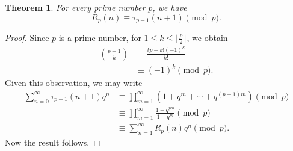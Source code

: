 \documentclass[10pt]{article}
\newtheorem{theorem}{Theorem}[section]
\theoremstyle{definition}
\begin{document}
\begin{theorem}
For every prime number $p$, we have
\begin{equation}
R_{p}(n)\equiv \tau_{p-1}(n+1)\pmod{p}.
\end{equation}
\end{theorem}
\begin{proof}
Since $p$ is a prime number, for $1\leq k\leq \lfloor\frac{p}{2}\rfloor$, we obtain
\begin{align*}{{p-1}\choose{k}}&=\frac{tp+k!(-1)^k}{k!}\\
&\equiv (-1)^{k}\pmod{p}.
\end{align*}
Given this observation, we may write
\begin{align*}
\sum_{n=0}^{\infty}\tau_{p-1}(n+1)q^{n}&\equiv\prod_{m=1}^{\infty}\left(1+q^{m}+\cdots +q^{(p-1)m}\right)\pmod{p}\\
&\equiv\prod_{m=1}^{\infty}\frac{1-q^{pm}}{1-q^m}\pmod{p}\\
&\equiv\sum_{n=1}^{\infty}R_p(n)q^n\pmod{p}.
\end{align*}
Now the result follows.
\end{proof}
\end{document}
